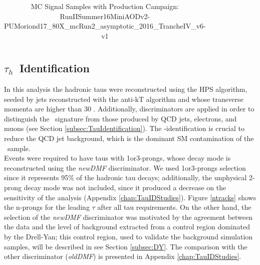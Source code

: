 \begin{table}[H]
\begin{center}
\begin{tabular}{| l | c | r | r |}
  \hline                                                                                                                                                                                                                                                         
  \end{tabular}                                                                                                                                                                                                                                                  
  \end{center}
  \caption{MC Signal Samples with Production Campaign: RunIISummer16MiniAODv2-PUMoriond17\_80X\_mcRun2\_asymptotic\_2016\_TrancheIV\_v6-v1}
  \label{tab:signal_samples}
\end{table}

\subsection{$\tau_{h}$~Identification}
\label{subsec:TauSelection}

\noindent In this analysis the hadronic taus were reconstructed 
using the HPS algorithm, seeded by jets reconstructed with 
the anti-kT algorithm and whose transverse momenta are higher 
than 30 \GeV. Additionally, discriminators are applied 
in order to distinguish the \tauh~signature from those produced by
QCD jets, electrons, and muons (see Section \ref{subsec:TauIdentification}).
The \tauh-identification is crucial to reduce the QCD jet background, 
which is the dominant SM contamination of the \Zprimetotauh~sample. \\

\noindent Events were required to have taus with 1or3-prongs, whose decay mode 
is reconstructed using the \textit{newDMF} discriminator. We used 1or3-prongs selection
since it represents 95$\%$ of the hadronic tau decays; additionally,
the unphysical 2-prong decay mode was not included, since it produced
a decrease on the sensitivity of the analysis (Appendix \ref{chap:TauIDStudies}). 
Figure \ref{ntracks} shows the n-prongs for the leading $\tau$ after all tau requirements.
On the other hand, the selection of the \textit{newDMF} discriminator was motivated by the agreement between 
the data and the level of background extracted from a control region dominated by the Drell-Yan;
this control region, used to validate the background simulation samples, will be described in
see Section \ref{subsec:DY}. The comparison with the other discriminator (\textit{oldDMF}) is 
presented  in Appendix \ref{chap:TauIDStudies}.  \\

